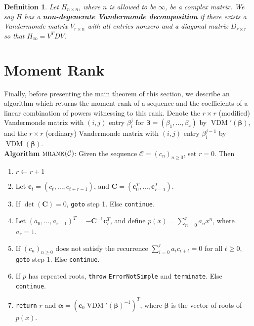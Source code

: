 \documentclass[12pt,reqno]{article}
\newtheorem{definition}{Definition}
\newcommand{\malg}{\textsc{mrank}}
\DeclareMathOperator{\vdm}{VDM}
\begin{document}
\begin{definition}\label{Def:no0Vande}
Let $H_{n\times n}$, where $n$ is allowed to be $\infty$, be a complex matrix. We say $H$ has a \textbf{non-degenerate Vandermonde decomposition} if there exists a Vandermonde matrix $V_{r\times n}$ with all entries nonzero and a diagonal matrix $D_{r\times r}$ so that $H_\infty = V^TDV$. 
\end{definition}

\section{Moment Rank}

Finally, before presenting the main theorem of this section, we describe an algorithm which returns the moment rank of a sequence and the coefficients of a linear combination of powers witnessing to this rank. Denote the $r \times r$ (modified) Vandermonde matrix with $(i,j)$ entry $\beta_i^{j}$ for $\boldsymbol{\beta} = (\beta_1,\ldots,\beta_r)$ by $\vdm'(\boldsymbol{\beta})$, and the $r \times r$ (ordinary) Vandermonde matrix with $(i,j)$ entry $\beta_i^{j-1}$ by $\vdm(\boldsymbol{\beta})$.\\

\noindent \textbf{Algorithm} $\malg(\mathcal{C})$: Given the sequence $\mathcal{C} = (c_n)_{n\geq 0}$, set $r=0$.  Then
\begin{enumerate}
    \item $r \leftarrow r+1$
    \item Let $\mathbf{c}_t = (c_t,\ldots,c_{t+r-1})$, and $\mathbf{C} = (\mathbf{c}_0^T, \ldots, \mathbf{c}_{r-1}^T)$.
    \item If $\det(\mathbf{C}) = 0$, \texttt{goto} step 1.  Else \texttt{continue}.
    \item Let $(a_0,\ldots,a_{r-1})^T = -\mathbf{C}^{-1} \mathbf{c}_r^T$, and define $p(x) = \sum_{n=0}^{r} a_n x^{n}$, where $a_r = 1$.
    \item If $(c_n)_{n \geq 0}$ does not satisfy the recurrence $\sum_{i=0}^{r} a_i c_{i+t} = 0$ for all $t \geq 0$, \texttt{goto} step 1.  Else \texttt{continue}.
    \item If $p$ has repeated roots, \texttt{throw} \texttt{ErrorNotSimple} and \texttt{terminate}.  Else \texttt{continue}.
    \item \texttt{return} $r$ and $\boldsymbol{\alpha} = (\mathbf{c}_0 \vdm'(\boldsymbol{\beta})^{-1})^T$, where $\boldsymbol{\beta}$ is the vector of roots of $p(x)$.
\end{enumerate}
\end{document}
